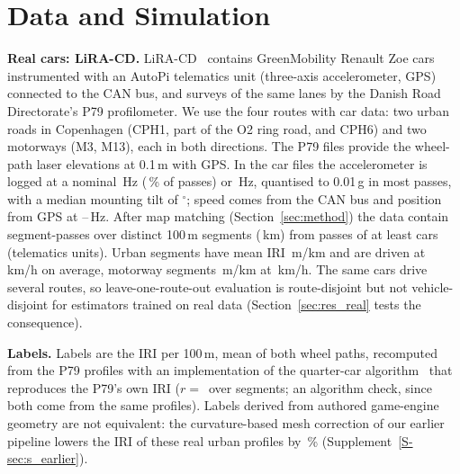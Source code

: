 \section{Data and Simulation}
\label{sec:data}

\textbf{Real cars: LiRA-CD.}
LiRA-CD~\cite{skar2023lira,lira_data} contains GreenMobility Renault Zoe cars instrumented with an AutoPi telematics unit (three-axis accelerometer, GPS) connected to the CAN bus, and surveys of the same lanes by the Danish Road Directorate's P79 profilometer.
We use the four routes with car data: two urban roads in Copenhagen (CPH1, part of the O2 ring road, and CPH6) and two motorways (M3, M13), each in both directions.
The P79 files provide the wheel-path laser elevations at 0.1\,m with GPS.
In the car files the accelerometer is logged at a nominal \liraRateLow\,Hz (\liraRateLowShare\,\% of passes) or \liraRateHigh\,Hz, quantised to 0.01\,g in most passes, with a median mounting tilt of \liraTiltMedian$^\circ$; speed comes from the CAN bus and position from GPS at \liraGpsHzMin--\liraGpsHzMax\,Hz.
After map matching (Section~\ref{sec:method}) the data contain \liraUnits{} segment-passes over \liraSegments{} distinct 100\,m segments (\liraKm\,km) from \liraPasses{} passes of at least \liraDevices{} cars (telematics units).
Urban segments have mean IRI \liraIriUrban\,m/km and are driven at \liraSpeedUrban\,km/h on average, motorway segments \liraIriMotorway\,m/km at \liraSpeedMotorway\,km/h.
The same cars drive several routes, so leave-one-route-out evaluation is route-disjoint but not vehicle-disjoint for estimators trained on real data (Section~\ref{sec:res_real} tests the consequence).

\textbf{Labels.}
Labels are the IRI per 100\,m, mean of both wheel paths, recomputed from the P79 profiles with an implementation of the quarter-car algorithm~\cite{sayers1995iri,astm_e1926} that reproduces the P79's own IRI ($r=$\,\iriValR{} over \iriValN{} segments; an algorithm check, since both come from the same profiles).
Labels derived from authored game-engine geometry are not equivalent: the curvature-based mesh correction of our earlier pipeline lowers the IRI of these real urban profiles by \legacyCorrUrbanMape\,\% (Supplement~\ref{S-sec:s_earlier}).

